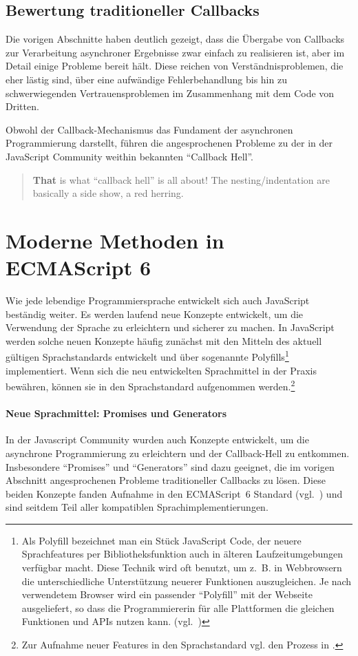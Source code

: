 \documentclass[
11pt, %
a4paper, %
oneside, %
pdfspacing, %
headinclude,
BCOR5mm, %
ngerman, %
bibtotocnumbered,
]{scrartcl}
\begin{document}
	\subsection{Bewertung traditioneller Callbacks}
		Die vorigen Abschnitte haben deutlich gezeigt, dass die Übergabe von Callbacks zur Verarbeitung asynchroner Ergebnisse zwar einfach zu realisieren ist, aber im Detail einige Probleme bereit hält. Diese reichen von Verständnisproblemen, die eher lästig sind, über eine aufwändige Fehlerbehandlung bis hin zu schwerwiegenden Vertrauensproblemen im Zusammenhang mit dem \-Code von Dritten.
		
		Obwohl der Callback-Mechanismus das Fundament der asynchronen Programmierung darstellt, führen die angesprochenen Probleme zu der in der JavaScript Community weithin bekannten "`Callback Hell"'.
		
		\begin{quote}
			\textbf{That }is what "`callback hell"' is all about! The nesting/indentation are basically a side show, a red herring.~\citep[S.~32]{Simpson.2015}
		\end{quote}

\section{Moderne Methoden in ECMAScript 6}
	Wie jede lebendige Programmiersprache entwickelt sich auch Java\-Script beständig weiter. Es werden laufend neue Konzepte entwickelt, um die Verwendung der Sprache zu erleichtern und sicherer zu machen. In JavaScript werden solche neuen Konzepte häufig zunächst mit den Mitteln des aktuell gültigen Sprachstandards entwickelt und über sogenannte Polyfills\footnote{
	Als Polyfill bezeichnet man ein Stück JavaScript \-Code, der neuere Sprach\-fea\-tures per Bibliotheksfunktion auch in älteren Laufzeitumgebungen verfügbar macht. Diese Technik wird oft benutzt, um z.~B. in Webbrowsern die unterschiedliche Unterstützung neuerer Funktionen auszugleichen. Je nach verwendetem Browser wird ein passender "`Polyfill"' mit der Webseite ausgeliefert, so dass die Programmiererin für alle Plattformen die gleichen Funktionen und APIs nutzen kann. (vgl.~\citep{Sharp.2010})}
	implementiert. Wenn sich die neu entwickelten Sprachmittel in der Praxis bewähren, können sie in den Sprachstandard aufgenommen werden.\footnote{Zur Aufnahme neuer Features in den Sprachstandard vgl. den Prozess in \citep{EcmaTC39committee.2016}.}

	\paragraph{Neue Sprachmittel: Promises und Generators}
	In der Javascript Community wurden auch Konzepte entwickelt, um die asynchrone Programmierung zu erleichtern und der Callback-Hell zu entkommen. Insbesondere "`Promises"' und "`Generators"' sind dazu geeignet, die im vorigen Abschnitt angesprochenen Probleme traditioneller Callbacks zu lösen. Diese beiden Konzepte fanden Aufnahme in den ECMAScript~6 Standard (vgl.~\citep{EcmaTC39.}) und sind seitdem Teil aller kompatiblen Sprachimplementierungen.
		
\end{document}
